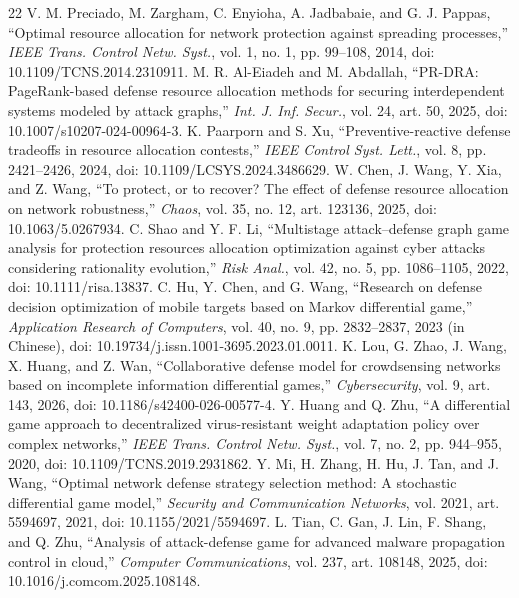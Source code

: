 \documentclass[conference,letterpaper]{IEEEtran}
\begin{document}
\begin{thebibliography}{22}
 V. M. Preciado, M. Zargham, C. Enyioha, A. Jadbabaie, and G. J. Pappas, ``Optimal resource allocation for network protection against spreading processes,'' \emph{IEEE Trans. Control Netw. Syst.}, vol. 1, no. 1, pp. 99--108, 2014, doi: 10.1109/TCNS.2014.2310911.
 M. R. Al-Eiadeh and M. Abdallah, ``PR-DRA: PageRank-based defense resource allocation methods for securing interdependent systems modeled by attack graphs,'' \emph{Int. J. Inf. Secur.}, vol. 24, art. 50, 2025, doi: 10.1007/s10207-024-00964-3.
 K. Paarporn and S. Xu, ``Preventive-reactive defense tradeoffs in resource allocation contests,'' \emph{IEEE Control Syst. Lett.}, vol. 8, pp. 2421--2426, 2024, doi: 10.1109/LCSYS.2024.3486629.
 W. Chen, J. Wang, Y. Xia, and Z. Wang, ``To protect, or to recover? The effect of defense resource allocation on network robustness,'' \emph{Chaos}, vol. 35, no. 12, art. 123136, 2025, doi: 10.1063/5.0267934.
 C. Shao and Y. F. Li, ``Multistage attack--defense graph game analysis for protection resources allocation optimization against cyber attacks considering rationality evolution,'' \emph{Risk Anal.}, vol. 42, no. 5, pp. 1086--1105, 2022, doi: 10.1111/risa.13837.
 C. Hu, Y. Chen, and G. Wang, ``Research on defense decision optimization of mobile targets based on Markov differential game,'' \emph{Application Research of Computers}, vol. 40, no. 9, pp. 2832--2837, 2023 (in Chinese), doi: 10.19734/j.issn.1001-3695.2023.01.0011.
 K. Lou, G. Zhao, J. Wang, X. Huang, and Z. Wan, ``Collaborative defense model for crowdsensing networks based on incomplete information differential games,'' \emph{Cybersecurity}, vol. 9, art. 143, 2026, doi: 10.1186/s42400-026-00577-4.
 Y. Huang and Q. Zhu, ``A differential game approach to decentralized virus-resistant weight adaptation policy over complex networks,'' \emph{IEEE Trans. Control Netw. Syst.}, vol. 7, no. 2, pp. 944--955, 2020, doi: 10.1109/TCNS.2019.2931862.
 Y. Mi, H. Zhang, H. Hu, J. Tan, and J. Wang, ``Optimal network defense strategy selection method: A stochastic differential game model,'' \emph{Security and Communication Networks}, vol. 2021, art. 5594697, 2021, doi: 10.1155/2021/5594697.
 L. Tian, C. Gan, J. Lin, F. Shang, and Q. Zhu, ``Analysis of attack-defense game for advanced malware propagation control in cloud,'' \emph{Computer Communications}, vol. 237, art. 108148, 2025, doi: 10.1016/j.comcom.2025.108148.

\end{thebibliography}
\end{document}
